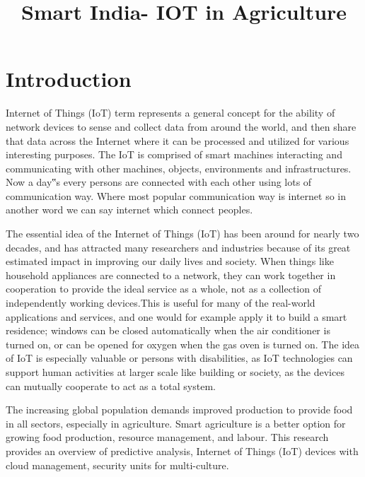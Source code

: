 \documentclass{article}
\title{\textbf{\huge Smart India- IOT in Agriculture}\\
	}
\date{}
\begin{document}
\pagestyle{headings}	
\newpage
\setcounter{page}{1}
\renewcommand{\thepage}{\arabic{page}}


	
\setlength{\parskip}{0.5em}

	
\maketitle

\section{Introduction}
Internet of Things (IoT) term represents a general concept 
for the ability of network devices to sense and collect data 
from around the world, and then share that data across the 
Internet where it can be processed and utilized for various 
interesting purposes. The IoT is comprised of smart 
machines interacting and communicating with other 
machines, objects, environments and infrastructures. Now a 
day‟s every persons are connected with each other using lots 
of communication way. Where most popular communication 
way is internet so in another word we can say internet which 
connect peoples. 

The essential idea of the Internet of Things (IoT) has been 
around for nearly two decades, and has attracted many 
researchers and industries because of its great estimated 
impact in improving our daily lives and society. When things 
like household appliances are connected to a network, they 
can work together in cooperation to provide the ideal service 
as a whole, not as a collection of independently working 
devices.This is useful for many of the real-world applications 
and services, and one would for example apply it to build a 
smart residence; windows can be closed automatically when 
the air conditioner is turned on, or can be opened for oxygen 
when the gas oven is turned on. The idea of IoT is especially 
valuable or persons with disabilities, as IoT technologies can 
support human activities at larger scale like building or 
society, as the devices can mutually cooperate to act as a 
total system.

The increasing global population demands improved production to provide food in all sectors, especially in agriculture. Smart agriculture is a better option for growing food production, resource management, and labour. This research provides an overview of predictive analysis, Internet of Things (IoT) devices with cloud management, security units for multi-culture.
\end{document}
